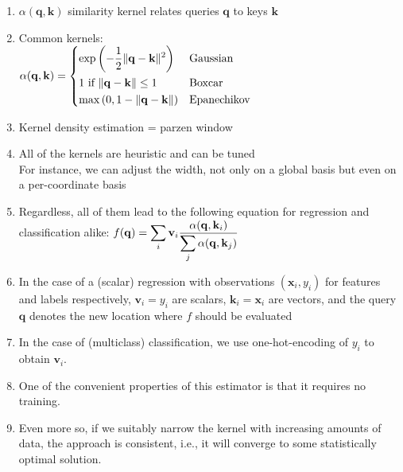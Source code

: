 \begin{enumerate}[itemsep=0.15cm]
    \item $\alpha(\mathbf{q}, \mathbf{k})$ similarity kernel relates queries $\mathbf{q}$ to keys $\mathbf{k}$
    
    \item Common kernels:\\
    $
        \alpha(\mathbf{q}, \mathbf{k}) = 
        \renewcommand{\arraystretch}{2}
        \begin{dcases}
            \exp\left(-\dfrac{1}{2} \|\mathbf{q} - \mathbf{k}\|^2 \right) & \textrm{Gaussian} \\
            1 \textrm{ if } \|\mathbf{q} - \mathbf{k}\| \leq 1 & \textrm{Boxcar} \\
            \mathop{\mathrm{max}}\left(0, 1 - \|\mathbf{q} - \mathbf{k}\|\right) & \textrm{Epanechikov}    
        \end{dcases}
        \renewcommand{\arraystretch}{1}
    $

    \item Kernel density estimation = parzen window

    \item All of the kernels are heuristic and can be tuned\\
    For instance, we can adjust the width, not only on a global basis but even on a per-coordinate basis

    \item Regardless, all of them lead to the following equation for regression and classification alike: $f(\mathbf{q}) = \displaystyle\sum_i \mathbf{v}_i \dfrac{\alpha(\mathbf{q}, \mathbf{k}_i)}{\displaystyle\sum_j \alpha(\mathbf{q}, \mathbf{k}_j)}$

    \item In the case of a (scalar) regression with observations $(\mathbf{x}_i, y_i)$ for features and labels respectively, $\mathbf{v}_i = y_i$ are scalars, $\mathbf{k}_i = \mathbf{x}_i$ are vectors, and the query $\mathbf{q}$ denotes the new location where $f$ should be evaluated

    \item In the case of (multiclass) classification, we use one-hot-encoding of $y_i$ to obtain $\mathbf{v}_i$. 
    
    \item One of the convenient properties of this estimator is that it requires no training. 
    
    \item Even more so, if we suitably narrow the kernel with increasing amounts of data, the approach is consistent, i.e., it will converge to some statistically optimal solution.


\end{enumerate}
